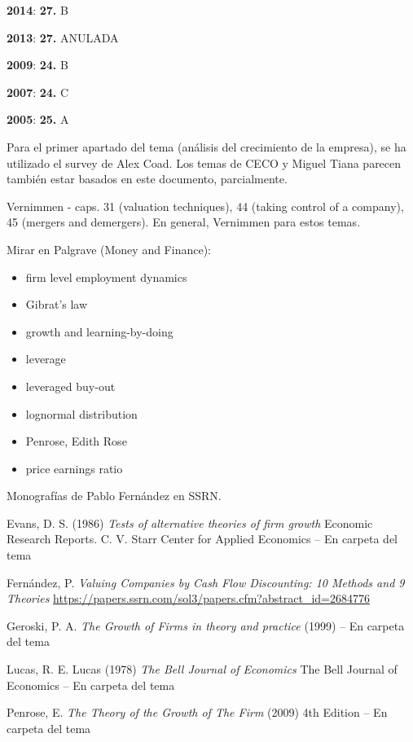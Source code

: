 \documentclass{nuevotema}
\begin{document}
\notas

\textbf{2014}: \textbf{27.} B

\textbf{2013}: \textbf{27.} ANULADA

\textbf{2009}: \textbf{24.} B

\textbf{2007}: \textbf{24.} C

\textbf{2005}: \textbf{25.} A



\bibliografia

Para el primer apartado del tema (análisis del crecimiento de la empresa), se ha utilizado el survey de Alex Coad. Los temas de CECO y Miguel Tiana parecen también estar basados en este documento, parcialmente.

Vernimmen - caps. 31 (valuation techniques), 44 (taking control of a company), 45 (mergers and demergers). En general, Vernimmen para estos temas.

Mirar en Palgrave (Money and Finance):
\begin{itemize}
	\item firm level employment dynamics
	\item Gibrat's law
	\item growth and learning-by-doing
    \item leverage
    \item leveraged buy-out
    \item lognormal distribution
    \item Penrose, Edith Rose
    \item price earnings ratio
\end{itemize}

Monografías de Pablo Fernández en SSRN.

Evans, D. S. (1986) \textit{Tests of alternative theories of firm growth} Economic Research Reports. C. V. Starr Center for Applied Economics -- En carpeta del tema

Fernández, P. \textit{Valuing Companies by Cash Flow Discounting: 10 Methods and 9 Theories } \url{https://papers.ssrn.com/sol3/papers.cfm?abstract\_id=2684776}

Geroski, P. A. \textit{The Growth of Firms in theory and practice} (1999) -- En carpeta del tema

Lucas, R. E. Lucas (1978) \textit{The Bell Journal of Economics} The Bell Journal of Economics -- En carpeta del tema

Penrose, E. \textit{The Theory of the Growth of The Firm} (2009) 4th Edition -- En carpeta del tema
\end{document}
